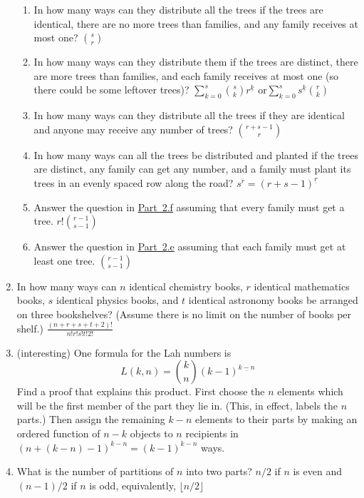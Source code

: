 \documentclass[10pt,]{book}
\theoremstyle{plain}
\theoremstyle{definition}
\numberwithin{equation}{chapter}
\begin{document}
\begin{enumerate}
\begin{enumerate}
%
\item\hypertarget{li-59}{}In how many ways can they distribute all the trees if the trees are identical, there are no more trees than families,   and any family receives at most one? \(\binom{s}{r}\)%
%
\item\hypertarget{li-60}{}In how many ways can they distribute them if the trees are distinct, there are more trees than families, and each family receives at most one (so there could be some leftover trees)? \(\sum_{k=0}^s \binom{s}{k}r^{\underline{k}}\) or\(\sum_{k=0}^s s^{\underline{k}}\binom{r}{k}\)%
%
\item\hypertarget{multisetproblem}{}In how many ways can they distribute all the trees if they are identical and anyone may receive any number of trees? \(\binom{r+s-1}{r}\)%
%
\item\hypertarget{orderedfunctionproblem}{}In how many ways can all the trees be distributed and planted if the trees are distinct, any family can get any number, and a family must plant its trees in an evenly spaced row along the road? \(s^{\overline{r}}=(r+s-1)^{\underline{r}}\)%
%
\item\hypertarget{li-63}{}Answer the question in \hyperlink{orderedfunctionproblem}{Part~2.f} assuming that every family must get a tree. \(r!\binom{r-1}{s-1}\)%
%
\item\hypertarget{li-64}{}Answer the question in \hyperlink{multisetproblem}{Part~2.e} assuming that each family must get at least one tree. \(\binom{r-1}{s-1}\)%
%
\end{enumerate}
%
\item\hypertarget{li-65}{}In how many ways can \(n\) identical chemistry books, \(r\) identical mathematics books, \(s\) identical physics books, and \(t\) identical astronomy books be arranged on three bookshelves? (Assume there is no limit on the number of books per shelf.) \(\frac{(n+r+s+t+2)!}{n!r!s!t!2!}\)%
%
\item\hypertarget{li-66}{}(interesting) One formula for the Lah numbers is%
\begin{equation*}
L(k,n) = \binom{k}{n}(k-1)^{\underline{k-n}}
\end{equation*}
Find a proof that explains this product. First choose the \(n\) elements which will be the first member of the part they lie in. (This, in effect, labels the \(n\) parts.) Then assign the remaining \(k-n\) elements to their parts by making an ordered function of \(n-k\) objects to \(n\) recipients in \((n + (k-n) - 1)^{{k-n}} = (k-1)^{{k-n}}\) ways.%
%
\item\hypertarget{li-67}{}What is the number of partitions of \(n\) into two parts? \(n/2\) if \(n\) is even and \((n-1)/2\) if \(n\) is odd, equivalently, \(\lfloor n/2\rfloor\)%

\end{enumerate}
\end{document}
